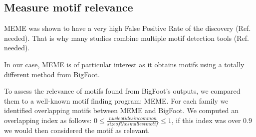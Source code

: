 \subsection*{Measure motif relevance}


MEME was shown to have a very high False Positive Rate of the discovery (Ref. needed). That is why many studies combine multiple motif detection tools (Ref. needed).

In our case, MEME is of particular interest as it obtains motifs using a totally different method from BigFoot.

To assess the relevance of motifs found from BigFoot's outputs, we compared them to a well-known motif finding program: MEME. For each family we identified overlapping motifs between MEME and BigFoot. We computed an overlapping index as follows: $0 \leq \frac{nucleotides in common}{size of the smallest motif} \leq 1$, if this index was over $0.9$ we would then considered the motif as relevant.